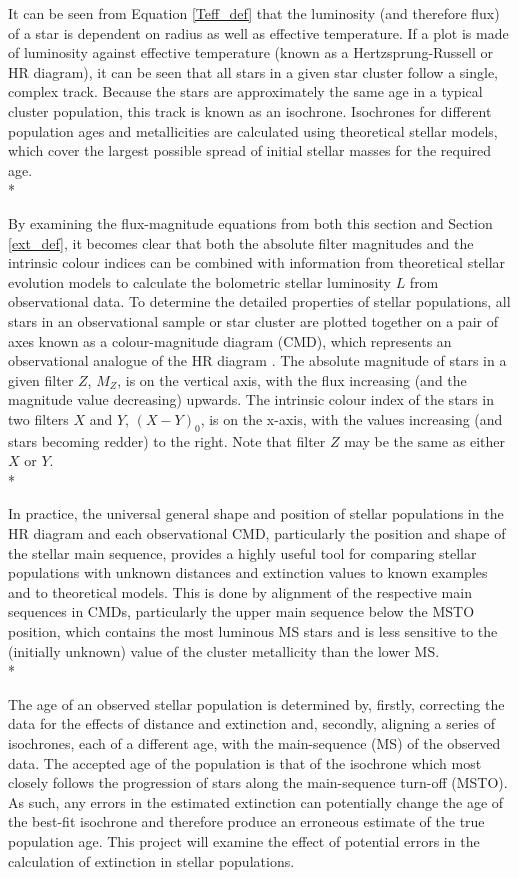 \documentclass[12pt, a4paper]{report}
\begin{document}
It can be seen from Equation \ref{Teff_def} that the luminosity (and therefore flux) of a star is dependent on radius as well as effective temperature. If a plot is made of luminosity against effective temperature (known as a Hertzsprung-Russell or HR diagram), it can be seen that all stars in a given star cluster follow a single, complex track. Because the stars are approximately the same age in a typical cluster population, this track is known as an isochrone. Isochrones for different population ages and metallicities are calculated using theoretical stellar models, which cover the largest possible spread of initial stellar masses for the required age.\\*

By examining the flux-magnitude equations from both this section and Section \ref{ext_def}, it becomes clear that both the absolute filter magnitudes and the intrinsic colour indices can be combined with information from theoretical stellar evolution models to calculate the bolometric stellar luminosity $L$ from observational data. To determine the detailed properties of stellar populations, all stars in an observational sample or star cluster are plotted together on a pair of axes known as a colour-magnitude diagram (CMD), which represents an observational analogue of the HR diagram \citep{2005ARA&A..43..293B}. The absolute magnitude of stars in a given filter $Z$, $M_{Z}$, is on the vertical axis, with the flux increasing (and the magnitude value decreasing) upwards. The intrinsic colour index of the stars in two filters $X$ and $Y$, $(X-Y)_{0}$, is on the x-axis, with the values increasing (and stars becoming redder) to the right. Note that filter $Z$ may be the same as either $X$ or $Y$.\\*

In practice, the universal general shape and position of stellar populations in the HR diagram and each observational CMD, particularly the position and shape of the stellar main sequence, provides a highly useful tool for comparing stellar populations with unknown distances and extinction values to known examples and to theoretical models. This is done by alignment of the respective main sequences in CMDs, particularly the upper main sequence below the MSTO position, which contains the most luminous MS stars and is less sensitive to the (initially unknown) value of the cluster metallicity than the lower MS. \\*

The age of an observed stellar population is determined by, firstly, correcting the data for the effects of distance and extinction and, secondly, aligning a series of isochrones, each of a different age, with the main-sequence (MS) of the observed data. The accepted age of the population is that of the isochrone which most closely follows the progression of stars along the main-sequence turn-off (MSTO). As such, any errors in the estimated extinction can potentially change the age of the best-fit isochrone and therefore produce an erroneous estimate of the true population age. This project will examine the effect of potential errors in the calculation of extinction in stellar populations.
\end{document}
